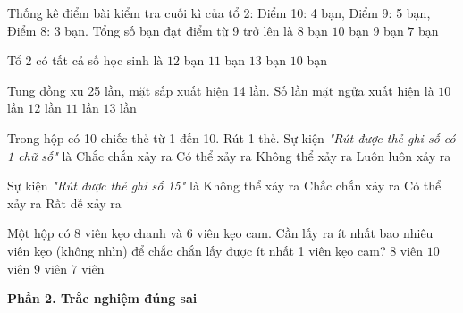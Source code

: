 \begin{ex} %
Thống kê điểm bài kiểm tra cuối kì của tổ 2: Điểm 10: 4 bạn, Điểm 9: 5 bạn, Điểm 8: 3 bạn. Tổng số bạn đạt điểm từ 9 trở lên là
\choice
{$8$ bạn}
{$10$ bạn}
{\True $9$ bạn}
{$7$ bạn}
\end{ex}

\begin{ex} %
Tổ 2 có tất cả số học sinh là
\choice
{\True $12$ bạn}
{$11$ bạn}
{$13$ bạn}
{$10$ bạn}
\end{ex}

\begin{ex} %
Tung đồng xu 25 lần, mặt sấp xuất hiện 14 lần. Số lần mặt ngửa xuất hiện là
\choice
{$10$ lần}
{$12$ lần}
{\True $11$ lần}
{$13$ lần}
\end{ex}

\begin{ex} %
Trong hộp có 10 chiếc thẻ từ 1 đến 10. Rút 1 thẻ. Sự kiện \textit{"Rút được thẻ ghi số có 1 chữ số"} là
\choice
{Chắc chắn xảy ra}
{\True Có thể xảy ra}
{Không thể xảy ra}
{Luôn luôn xảy ra}
\end{ex}

\begin{ex} %
Sự kiện \textit{"Rút được thẻ ghi số 15"} là
\choice
{\True Không thể xảy ra}
{Chắc chắn xảy ra}
{Có thể xảy ra}
{Rất dễ xảy ra}
\end{ex}

\begin{ex} %
Một hộp có 8 viên kẹo chanh và 6 viên kẹo cam. Cần lấy ra ít nhất bao nhiêu viên kẹo (không nhìn) để chắc chắn lấy được ít nhất 1 viên kẹo cam?
\choice
{$8$ viên}
{$10$ viên}
{\True $9$ viên}
{$7$ viên}
\end{ex}

\textbf{Phần 2. Trắc nghiệm đúng sai}

